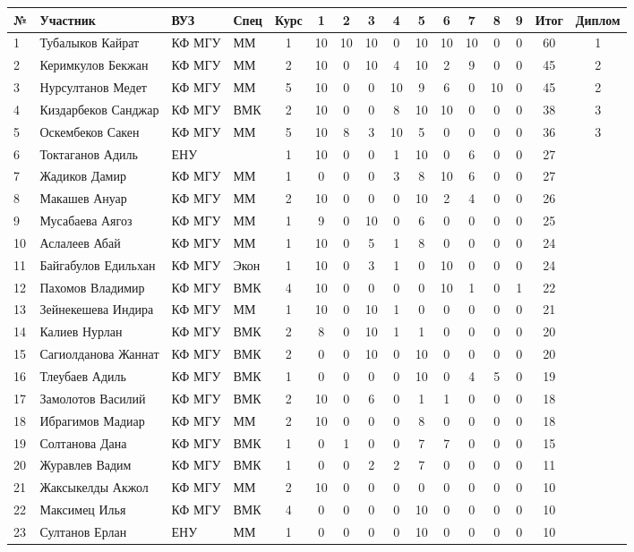 \begin{tabular}{|l|l|l|l|c|*{9}{c|}c|c|}
\hline
№ & Участник & ВУЗ & Спец & Курс & 1 & 2 & 3 & 4 & 5 & 6 & 7 & 8 & 9 & Итог & Диплом\\
\hline
1 & Тубалыков Кайрат & КФ МГУ & ММ & 1 & 10 & 10 & 10 & 0 & 10 & 10 & 10 & 0 & 0 & 60 & 1\\
\hline
2 & Керимкулов Бекжан & КФ МГУ & ММ & 2 & 10 & 0 & 10 & 4 & 10 & 2 & 9 & 0 & 0 & 45 & 2\\
\hline
3 & Нурсултанов Медет & КФ МГУ & ММ & 5 & 10 & 0 & 0 & 10 & 9 & 6 & 0 & 10 & 0 & 45 & 2\\
\hline
4 & Киздарбеков Санджар & КФ МГУ & ВМК & 2 & 10 & 0 & 0 & 8 & 10 & 10 & 0 & 0 & 0 & 38 & 3\\
\hline
5 & Оскембеков Сакен & КФ МГУ & ММ & 5 & 10 & 8 & 3 & 10 & 5 & 0 & 0 & 0 & 0 & 36 & 3\\
\hline
6 & Токтаганов Адиль & ЕНУ & & 1 & 10 & 0 & 0 & 1 & 10 & 0 & 6 & 0 & 0 & 27 & \\
\hline
7 & Жадиков Дамир & КФ МГУ & ММ & 1 & 0 & 0 & 0 & 3 & 8 & 10 & 6 & 0 & 0 & 27 & \\
\hline
8 & Макашев Ануар & КФ МГУ & ММ & 2 & 10 & 0 & 0 & 0 & 10 & 2 & 4 & 0 & 0 & 26 & \\
\hline
9 & Мусабаева Аягоз & КФ МГУ & ММ & 1 & 9 & 0 & 10 & 0 & 6 & 0 & 0 & 0 & 0 & 25 & \\
\hline
10 & Аслалеев Абай & КФ МГУ & ММ & 1 & 10 & 0 & 5 & 1 & 8 & 0 & 0 & 0 & 0 & 24 & \\
\hline
11 & Байгабулов Едильхан & КФ МГУ & Экон & 1 & 10 & 0 & 3 & 1 & 0 & 10 & 0 & 0 & 0 & 24 & \\
\hline
12 & Пахомов Владимир & КФ МГУ & ВМК & 4 & 10 & 0 & 0 & 0 & 0 & 10 & 1 & 0 & 1 & 22 & \\
\hline
13 & Зейнекешева Индира & КФ МГУ & ММ & 1 & 10 & 0 & 10 & 1 & 0 & 0 & 0 & 0 & 0 & 21 & \\
\hline
14 & Калиев Нурлан & КФ МГУ & ВМК & 2 & 8 & 0 & 10 & 1 & 1 & 0 & 0 & 0 & 0 & 20 & \\
\hline
15 & Сагиолданова Жаннат & КФ МГУ & ВМК & 2 & 0 & 0 & 10 & 0 & 10 & 0 & 0 & 0 & 0 & 20 & \\
\hline
16 & Тлеубаев Адиль & КФ МГУ & ВМК & 1 & 0 & 0 & 0 & 0 & 10 & 0 & 4 & 5 & 0 & 19 & \\
\hline
17 & Замолотов Василий & КФ МГУ & ВМК & 2 & 10 & 0 & 6 & 0 & 1 & 1 & 0 & 0 & 0 & 18 & \\
\hline
18 & Ибрагимов Мадиар & КФ МГУ & ММ & 2 & 10 & 0 & 0 & 0 & 8 & 0 & 0 & 0 & 0 & 18 & \\
\hline
19 & Солтанова Дана & КФ МГУ & ВМК & 1 & 0 & 1 & 0 & 0 & 7 & 7 & 0 & 0 & 0 & 15 & \\
\hline
20 & Журавлев Вадим & КФ МГУ & ВМК & 1 & 0 & 0 & 2 & 2 & 7 & 0 & 0 & 0 & 0 & 11 & \\
\hline
21 & Жаксыкелды Акжол & КФ МГУ & ММ & 2 & 10 & 0 & 0 & 0 & 0 & 0 & 0 & 0 & 0 & 10 & \\
\hline
22 & Максимец Илья & КФ МГУ & ВМК & 4 & 0 & 0 & 0 & 0 & 10 & 0 & 0 & 0 & 0 & 10 & \\
\hline
23 & Султанов Ерлан & ЕНУ & ММ & 1 & 0 & 0 & 0 & 0 & 10 & 0 & 0 & 0 & 0 & 10 & \\
\hline
\end{tabular}